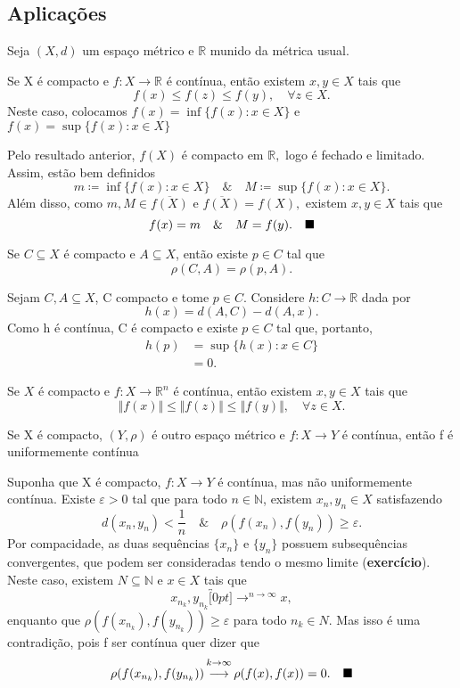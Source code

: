 \documentclass[MetricSpaces/metric_notes.tex]{subfiles}
\begin{document}
\subsection{Aplicações}
Seja \((X, d)\) um espaço métrico e \(\mathbb{R}\) munido da métrica usual.
\begin{theorem*}
	Se X é compacto e \(f:X\rightarrow \mathbb{R}\) é contínua, então existem \(x, y\in X\) tais que
	\[
		f(x)\leq f(z)\leq f(y),\quad \forall z\in X.
	\]
	Neste caso, colocamos \(f(x)=\inf\{f(x):x\in X\}\) e \(f(x) = \sup\{f(x):x\in X\}\)
\end{theorem*}
\begin{proof*}
	Pelo resultado anterior, \(f(X)\) é compacto em \(\mathbb{R},\) logo é fechado e limitado. Assim, estão bem definidos
	\[
		m\coloneqq \inf\{f(x):x\in X\}\quad\&\quad M\coloneqq \sup\{f(x):x\in X\}.
	\]
	Além disso, como \(m, M\in \overline{f(X)}\) e \(\overline{f(X)} = f(X),\) existem \(x, y\in X\) tais que
	\[
		f(x) = m\quad\&\quad M = f(y).\quad \text{$\blacksquare$}
	\]
\end{proof*}
\begin{crl*}
	Se \(C\subseteq X\) é compacto e \(A\subseteq X\), então existe \(p\in C\) tal que
	\[
		\rho (C, A) = \rho (p, A).
	\]
\end{crl*}
\begin{proof*}
	Sejam \(C, A\subseteq X\), C compacto e tome \(p\in C\). Considere \(h:C\rightarrow \mathbb{R}\) dada por
	\[
		h(x) = d(A, C) - d(A, x).
	\]
	Como h é contínua, C é compacto e existe \(p\in C\) tal que, portanto,
	\begin{align*}
		h(p) & = \sup\{h(x):x\in C\} \\
		     & = 0.
	\end{align*}
\end{proof*}
\begin{crl*}
	Se \(X\) é compacto e \(f:X\rightarrow \mathbb{R}^{n}\) é contínua, então existem \(x, y\in X\) tais que
	\[
		\Vert f(x) \Vert\leq \Vert f(z) \Vert\leq \Vert f(y) \Vert,\quad \forall z\in X.
	\]
\end{crl*}
\begin{prop*}
	Se X é compacto, \((Y, \rho )\) é outro espaço métrico e \(f:X\rightarrow Y \) é contínua, então f é uniformemente contínua
\end{prop*}
\begin{proof*}
	Suponha que X é compacto, \(f:X\rightarrow Y\) é contínua, mas não uniformemente contínua. Existe \(\varepsilon >0\) tal que
	para todo \(n\in \mathbb{N}\), existem \(x_{n}, y_{n}\in X\) satisfazendo
	\[
		d(x_{n},y_{n}) < \frac{1}{n}\quad\&\quad \rho (f(x_{n}), f(y_{n}))\geq \varepsilon .
	\]
	Por compacidade, as duas sequências \(\{x_{n}\}\) e \(\{y_{n}\}\) possuem subsequências convergentes, que podem
	ser consideradas tendo o mesmo limite (\textbf{exercício}). Neste caso, existem \(N\subseteq \mathbb{N}\) e \(x\in X\) tais que
	\[
		x_{n_{k}}, y_{n_{k}}\overbracket[0pt]{\longrightarrow}^{n\to \infty}x,
	\]
	enquanto que \(\rho (f(x_{n_{k}}), f(y_{n_{k}}))\geq \varepsilon \) para todo \(n_{k}\in N\).
	Mas isso é uma contradição, pois f ser contínua quer dizer que
	\[
		\rho (f(x_{n_{k}}), f(y_{n_{k}}))\overbracket[0pt]{\longrightarrow}^{k\to \infty}\rho(f(x), f(x)) = 0.\quad \text{\qedsymbol}
	\]
\end{proof*}
\end{document}
